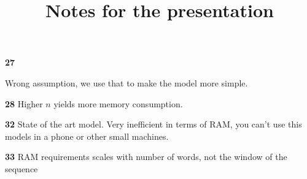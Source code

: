 \documentclass{article}
\title{Notes for the presentation}
\begin{document}
\maketitle

\textbf{27}

Wrong assumption, we use that to make the model more simple.

\textbf{28}
Higher $n$ yields more memory consumption.


\textbf{32}
State of the art model. Very inefficient in terms of RAM, you can't use this models in a phone or other small machines.


\textbf{33}
RAM requirements scales with number of words, not the window of the sequence
\end{document}
